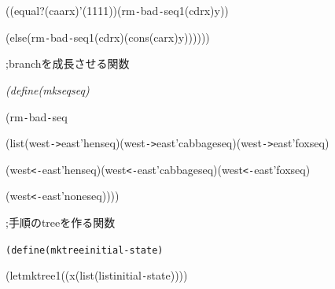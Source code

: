 \documentclass{article}
\begin{document}
\noindent
\mbox{}{\sl {}\charwd}{\sl {}\charwd}((equal?{\sl {}\charwd}(caar{\sl {}\charwd}x){\sl {}\charwd}'(1{\sl {}\charwd}1{\sl {}\charwd}1{\sl {}\charwd}1)){\sl {}\charwd}(rm{\tt -}bad{\tt -}seq1{\sl {}\charwd}(cdr{\sl {}\charwd}x){\sl {}\charwd}y))

\noindent
\mbox{}{\sl {}\charwd}{\sl {}\charwd}(else{\sl {}\charwd}(rm{\tt -}bad{\tt -}seq1{\sl {}\charwd}(cdr{\sl {}\charwd}x){\sl {}\charwd}(cons{\sl {}\charwd}(car{\sl {}\charwd}x){\sl {}\charwd}y))))))

\noindent
\mbox{}\hfill

\noindent
\mbox{}\rm\mc \bf %

\noindent
\mbox{};\charwd branch\charwd を成長させる関数

\noindent
\mbox{}\sl (define{\sl {}\charwd}(mkseq{\sl {}\charwd}seq)

\noindent
\mbox{}{\sl {}\charwd}(rm{\tt -}bad{\tt -}seq

\noindent
\mbox{}{\sl {}\charwd}(list{\sl {}\charwd}(west{\tt -}{\tt >}east{\sl {}\charwd}'hen{\sl {}\charwd}seq){\sl {}\charwd}(west{\tt -}{\tt >}east{\sl {}\charwd}'cabbage{\sl {}\charwd}seq){\sl {}\charwd}(west{\tt -}{\tt >}east{\sl {}\charwd}'fox{\sl {}\charwd}seq)

\noindent
\mbox{}{\sl {}\charwd}{\sl {}\charwd}(west{\tt <}{\tt -}east{\sl {}\charwd}'hen{\sl {}\charwd}seq){\sl {}\charwd}(west{\tt <}{\tt -}east{\sl {}\charwd}'cabbage{\sl {}\charwd}seq){\sl {}\charwd}(west{\tt <}{\tt -}east{\sl {}\charwd}'fox{\sl {}\charwd}seq)

\noindent
\mbox{}{\sl {}\charwd}{\sl {}\charwd}(west{\tt <}{\tt -}east{\sl {}\charwd}'none{\sl {}\charwd}seq))))

\noindent
\mbox{}\hfill

\noindent
\mbox{}\bf \bf %

\noindent
\mbox{};\charwd 手順の\charwd tree\charwd を作る関数

\noindent
\mbox{}\tt\mc (define{\tt\mc {}\charwd}(mktree{\tt\mc {}\charwd}initial{\tt -}state)

\noindent
\mbox{}{\tt\mc {}\charwd}(let{\tt\mc {}\charwd}mktree1{\tt\mc {}\charwd}((x{\tt\mc {}\charwd}(list{\tt\mc {}\charwd}(list{\tt\mc {}\charwd}initial{\tt -}state))))
\end{document}
